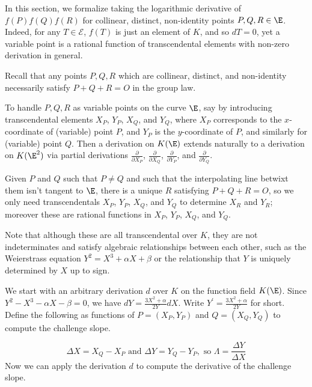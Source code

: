 \documentclass[11pt,letterpaper]{article}
\theoremstyle{definition}
\newcommand{\6}{\mathbf}
\newcommand{\7}{\mathcal}
\begin{document}
In this section, we formalize taking the logarithmic derivative of $f(P)f(Q)f(R)$ for collinear, distinct, non-identity points $P, Q, R \in \E$. Indeed, for any $T \in \mathcal{E}$, $f(T)$ is just an element of $K$, and so $dT = 0$, yet a variable point is a rational function of transcendental elements with non-zero derivation in general.

Recall that any points $P, Q, R$ which are collinear, distinct, and non-identity necessarily satisfy $P + Q + R = O$ in the group law.

To handle  $P, Q, R$ as variable points on the curve $\E$, say by introducing transcendental elements $X_P$, $Y_P$, $X_Q$, and $Y_Q$, where $X_P$ corresponds to the $x$-coordinate of (variable) point $P$, and $Y_P$ is the $y$-coordinate of $P$, and similarly for (variable) point $Q$. Then a derivation on $K(\E)$ extends naturally to a derivation on $K(\E^2)$ via partial derivations $\frac{\partial}{\partial X_P}$, $\frac{\partial}{\partial X_Q}$, $\frac{\partial}{\partial Y_P}$, and $\frac{\partial}{\partial Y_Q}$.

Given $P$ and $Q$ such that $P \neq Q$ and such that the interpolating line betwixt them isn't tangent to $\E$, there is a unique $R$ satisfying $P + Q + R = O$, so we only need transcendentals $X_P$, $Y_P$, $X_Q$, and $Y_Q$ to determine $X_R$ and $Y_R$; moreover these are rational functions in $X_P$, $Y_P$, $X_Q$, and $Y_Q$.

Note that although these are all transcendental over $K$, they are not indeterminates and satisfy algebraic relationships between each other, such as the Weierstrass equation $Y^2 = X^3 + \alpha X + \beta$ or the relationship that $Y$ is uniquely determined by $X$ up to sign. 

We start with an arbitrary derivation $d$ over $K$ on the function field $K(\E)$. Since $Y^2 - X^3 - \alpha X - \beta = 0$, we have $dY = \frac{3X^2+\alpha}{2Y}dX$. Write $Y^\prime = \frac{3X^2+\alpha}{2Y}$ for short. Define the following as functions of $P=(X_P, Y_P)$ and $Q=(X_Q,Y_Q)$ to compute the challenge slope.


$$\Delta X = X_Q - X_P  \text{ and }  \Delta Y = Y_Q - Y_P,  \text{ so }  \Lambda = \frac{\Delta Y}{\Delta X} \label{BigLambda}$$
Now we can apply the derivation $d$ to compute the derivative of the challenge slope.

\end{document}
